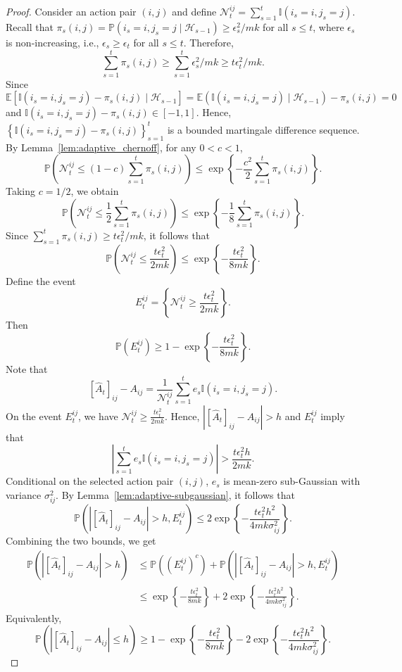 \documentclass[12pt]{article}
\begin{document}
\begin{proof}
Consider an action pair $(i,j)$ and define $\mathcal N_t^{ij}=\sum_{s=1}^t \mathbb I(i_s=i,j_s=j)$.
Recall that $\pi_s(i,j) = \mathbb P(i_s=i,j_s=j\mid \mathcal H_{s-1}) \ge \epsilon_s^2/mk$ for all $s\le t$, where $\epsilon_s$ is non-increasing, i.e., \(\epsilon_s\ge \epsilon_t\) for all \(s\le t\). Therefore,
\[
\sum_{s=1}^t \pi_s(i,j)
\ge
\sum_{s=1}^t \epsilon_s^2/mk
\ge t \epsilon_t^2/mk.
\]
Since
\[
\mathbb E\left[
\mathbb I(i_s=i,j_s=j)-\pi_s(i,j)
\mid
\mathcal H_{s-1}
\right]
=
\mathbb E(\mathbb I(i_s=i,j_s=j)\mid \mathcal H_{s-1})
- \pi_s(i,j)=  0
\]
and $\mathbb I(i_s=i,j_s=j)-\pi_s(i,j)\in[-1,1]$.
Hence, $\left\{ \mathbb I(i_s=i,j_s=j)-\pi_s(i,j) \right\}_{s=1}^t$ is a bounded martingale difference sequence.
By Lemma~\ref{lem:adaptive_chernoff}, for any $0<c<1$,
\[
\mathbb P\left(
\mathcal N_t^{ij}
\le
(1-c)\sum_{s=1}^t \pi_s(i,j)
\right)
\le
\exp\left\{
-\frac{c^2}{2}\sum_{s=1}^t \pi_s(i,j)
\right\}.
\]
Taking $c=1/2$, we obtain
\[
\mathbb P\left(
\mathcal N_t^{ij}
\le
\frac12 \sum_{s=1}^t \pi_s(i,j)
\right)
\le
\exp\left\{
-\frac18\sum_{s=1}^t \pi_s(i,j)
\right\}.
\]
Since $\sum_{s=1}^t \pi_s(i,j)\ge t\epsilon_t^2/mk$, it follows that
\begin{equation}
\label{equ1}
\mathbb P\left(
\mathcal N_t^{ij}
\le
\frac{t \epsilon_t^2}{2mk}
\right)
\le
\exp\left\{
-\frac{t \epsilon_t^2}{8mk}
\right\}.
\end{equation}
Define the event
\[
E_t^{ij}
=
\left\{
\mathcal N_t^{ij}
\ge
\frac{t \epsilon_t^2}{2mk}
\right\}.
\]
Then
\[
\mathbb P(E_t^{ij})
\ge
1-\exp\left\{
-\frac{t \epsilon_t^2}{8mk}
\right\}.
\]
Note that
\[
[\widehat A_t]_{ij}-A_{ij}
=
\frac{1}{\mathcal N_t^{ij}}
\sum_{s=1}^t e_s \mathbb I(i_s=i,j_s=j).
\]
On the event $E_t^{ij}$, we have $\mathcal N_t^{ij} \ge \frac{t \epsilon_t^2}{2mk}$.
Hence, $\left| [\widehat A_t]_{ij}-A_{ij} \right|>h$ and $E_t^{ij}$
imply that
\[
\left|
\sum_{s=1}^t e_s \mathbb I(i_s=i,j_s=j)
\right|
>
\frac{t \epsilon_t^2 h}{2mk}.
\]
Conditional on the selected action pair $(i,j)$, $e_s$ is mean-zero sub-Gaussian with variance $\sigma_{ij}^2$.
By Lemma~\ref{lem:adaptive-subgaussian}, it follows that
\[
\mathbb P\left(
\left|
[\widehat A_t]_{ij}-A_{ij}
\right|>h,
E_t^{ij}
\right)
\le
2\exp\left\{
-\frac{
t\epsilon_t^2h^2
}{
4mk\sigma_{ij}^2
}
\right\}.
\]
Combining the two bounds, we get
\begin{align*}
\mathbb P\left(
\left|
[\widehat A_t]_{ij}-A_{ij}
\right|>h
\right)
&\le
\mathbb P\left((E_t^{ij})^c\right) + \mathbb P\left(
\left|
[\widehat A_t]_{ij}-A_{ij}
\right|>h,
E_t^{ij}
\right) \\
& \le
\exp\left\{
-\frac{t \epsilon_t^2}{8mk}
\right\}
+
2\exp\left\{
-\frac{t \epsilon_t^2 h^2}{4mk\sigma_{ij}^2}
\right\}.
\end{align*}
Equivalently,
\[
\mathbb P\left(
\left|
[\widehat A_t]_{ij}-A_{ij}
\right|
\le h
\right)
\ge
1
-
\exp\left\{
-\frac{t \epsilon_t^2}{8mk}
\right\}
-
2\exp\left\{
-\frac{t \epsilon_t^2 h^2}{4mk\sigma_{ij}^2}
\right\}.
\]
\end{proof}
\end{document}
